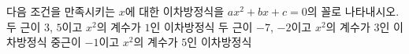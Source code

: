 다음 조건을 만족시키는 $x$에 대한 이차방정식을 $ax^2+bx+c=0$의 꼴로 나타내시오.
 두 근이 $3$, $5$이고 $x^2$의 계수가 $1$인 이차방정식
 두 근이 $-7$, $-2$이고 $x^2$의 계수가 $3$인 이차방정식
 중근이 $-1$이고 $x^2$의 계수가 $5$인 이차방정식
